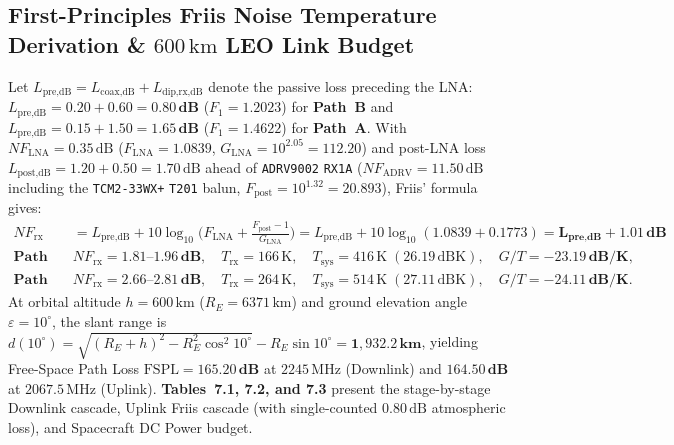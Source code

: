 \documentclass[10pt,a4paper]{article}
\renewcommand{\_}{\origunderscore\penalty0\hskip0pt\relax}
\numberwithin{equation}{section}
\numberwithin{table}{section}
\numberwithin{figure}{section}
\begin{document}
\subsection{First-Principles Friis Noise Temperature Derivation \& $600\,\text{km}$ LEO Link Budget}
Let $L_{\text{pre,dB}} = L_{\text{coax,dB}} + L_{\text{dip,rx,dB}}$ denote the passive loss preceding the LNA: $L_{\text{pre,dB}} = 0.20 + 0.60 = \mathbf{0.80\,\text{dB}}$ ($F_1 = 1.2023$) for \textbf{Path~B} and $L_{\text{pre,dB}} = 0.15 + 1.50 = \mathbf{1.65\,\text{dB}}$ ($F_1 = 1.4622$) for \textbf{Path~A}. With $NF_{\text{LNA}} = 0.35\,\text{dB}$ ($F_{\text{LNA}} = 1.0839$, $G_{\text{LNA}} = 10^{2.05} = 112.20$) and post-LNA loss $L_{\text{post,dB}} = 1.20 + 0.50 = 1.70\,\text{dB}$ ahead of \texttt{ADRV9002} \texttt{RX1A} ($NF_{\text{ADRV}} = 11.50\,\text{dB}$ including the \texttt{TCM2-33WX+} \texttt{T201} balun, $F_{\text{post}} = 10^{1.32} = 20.893$), Friis' formula gives:
\begin{equation}
\begin{aligned}
  NF_{\text{rx}} &= L_{\text{pre,dB}} + 10\log_{10}\!\Big(F_{\text{LNA}} + \frac{F_{\text{post}} - 1}{G_{\text{LNA}}}\Big)
                  = L_{\text{pre,dB}} + 10\log_{10}(1.0839 + 0.1773) = \mathbf{L_{\text{pre,dB}} + 1.01\,\text{dB}} \\[2pt]
  \textbf{Path B:}\quad & NF_{\text{rx}} = \mathbf{1.81\text{--}1.96\,\text{dB}}, \quad T_{\text{rx}} = 166\,\text{K}, \quad T_{\text{sys}} = 416\,\text{K}\;(26.19\,\text{dBK}), \quad G/T = \mathbf{-23.19\,\text{dB/K}}, \\
  \textbf{Path A:}\quad & NF_{\text{rx}} = \mathbf{2.66\text{--}2.81\,\text{dB}}, \quad T_{\text{rx}} = 264\,\text{K}, \quad T_{\text{sys}} = 514\,\text{K}\;(27.11\,\text{dBK}), \quad G/T = \mathbf{-24.11\,\text{dB/K}}.
\end{aligned}
\end{equation}
At orbital altitude $h = 600\,\text{km}$ ($R_E = 6371\,\text{km}$) and ground elevation angle $\varepsilon = 10^\circ$, the slant range is $d(10^\circ) = \sqrt{(R_E + h)^2 - R_E^2\cos^2 10^\circ} - R_E\sin 10^\circ = \mathbf{1{,}932.2\,\text{km}}$, yielding Free-Space Path Loss $\text{FSPL} = \mathbf{165.20\,\text{dB}}$ at $2245\,\text{MHz}$ (Downlink) and $\mathbf{164.50\,\text{dB}}$ at $2067.5\,\text{MHz}$ (Uplink). \textbf{Tables~7.1, 7.2, and 7.3} present the stage-by-stage Downlink cascade, Uplink Friis cascade (with single-counted $0.80\,\text{dB}$ atmospheric loss), and Spacecraft DC Power budget.
\end{document}
